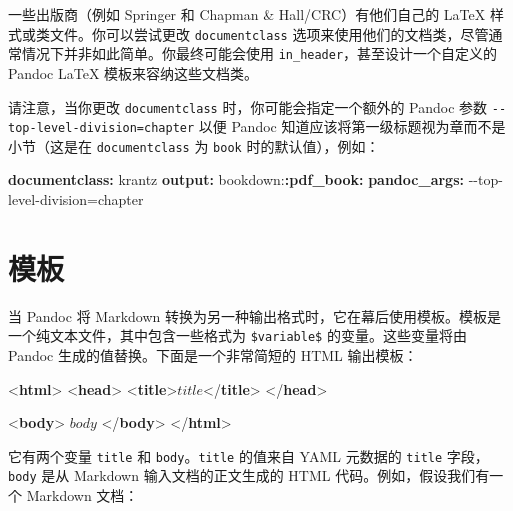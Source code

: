 \documentclass[
  12pt,
]{krantz}
\newenvironment{Shaded}{\begin{snugshade}}{\end{snugshade}}
\newcommand{\AttributeTok}[1]{\textcolor[rgb]{0.13,0.29,0.53}{#1}}
\newcommand{\DataTypeTok}[1]{\textcolor[rgb]{0.13,0.29,0.53}{#1}}
\newcommand{\FunctionTok}[1]{\textcolor[rgb]{0.13,0.29,0.53}{\textbf{#1}}}
\newcommand{\KeywordTok}[1]{\textcolor[rgb]{0.13,0.29,0.53}{\textbf{#1}}}
\newcommand{\NormalTok}[1]{#1}
\theoremstyle{definition}
\theoremstyle{definition}
\theoremstyle{definition}
\theoremstyle{definition}
\theoremstyle{remark}
\begin{document}
一些出版商（例如 Springer 和 Chapman \& Hall/CRC）有他们自己的 LaTeX 样式或类文件。你可以尝试更改 \texttt{documentclass} 选项来使用他们的文档类，尽管通常情况下并非如此简单。你最终可能会使用 \texttt{in\_header}，甚至设计一个自定义的 Pandoc LaTeX 模板来容纳这些文档类。

请注意，当你更改 \texttt{documentclass} 时，你可能会指定一个额外的 Pandoc 参数 \texttt{-\/-top-level-division=chapter} 以便 Pandoc 知道应该将第一级标题视为章而不是小节（这是在 \texttt{documentclass} 为 \texttt{book} 时的默认值），例如：

\begin{Shaded}
\begin{Highlighting}[]
\FunctionTok{documentclass}\KeywordTok{:}\AttributeTok{ krantz}
\FunctionTok{output}\KeywordTok{:}
\AttributeTok{  bookdown:}\FunctionTok{:pdf\_book}\KeywordTok{:}
\AttributeTok{    }\FunctionTok{pandoc\_args}\KeywordTok{:}\AttributeTok{ {-}{-}top{-}level{-}division=chapter}
\end{Highlighting}
\end{Shaded}

\section{模板}\label{ux6a21ux677f}

当 Pandoc 将 Markdown 转换为另一种输出格式时，它在幕后使用模板。模板是一个纯文本文件，其中包含一些格式为 \texttt{\$variable\$} 的变量。这些变量将由 Pandoc 生成的值替换。下面是一个非常简短的 HTML 输出模板：

\begin{Shaded}
\begin{Highlighting}[]
\DataTypeTok{\textless{}}\KeywordTok{html}\DataTypeTok{\textgreater{}}
  \DataTypeTok{\textless{}}\KeywordTok{head}\DataTypeTok{\textgreater{}}
    \DataTypeTok{\textless{}}\KeywordTok{title}\DataTypeTok{\textgreater{}}\NormalTok{$title$}\DataTypeTok{\textless{}/}\KeywordTok{title}\DataTypeTok{\textgreater{}}
  \DataTypeTok{\textless{}/}\KeywordTok{head}\DataTypeTok{\textgreater{}}
  
  \DataTypeTok{\textless{}}\KeywordTok{body}\DataTypeTok{\textgreater{}}
\NormalTok{  $body$}
  \DataTypeTok{\textless{}/}\KeywordTok{body}\DataTypeTok{\textgreater{}}
\DataTypeTok{\textless{}/}\KeywordTok{html}\DataTypeTok{\textgreater{}}
\end{Highlighting}
\end{Shaded}

它有两个变量 \texttt{title} 和 \texttt{body}。\texttt{title} 的值来自 YAML 元数据的 \texttt{title} 字段，\texttt{body} 是从 Markdown 输入文档的正文生成的 HTML 代码。例如，假设我们有一个 Markdown 文档：
\end{document}
